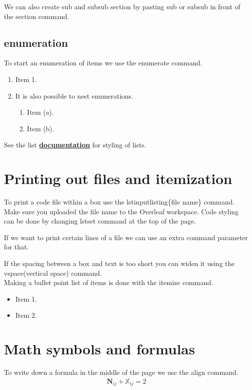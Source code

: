 \documentclass{article}
\begin{document}
We can also create sub and subsub section by pasting sub or subsub in front of the section command.
\subsection{enumeration}

To start an enumeration of items we use the enumerate command.
\begin{enumerate}
    \item Item 1.
    \item It is also possible to nest enumerations.
        \begin{enumerate}
            \item Item (a).
            \item Item (b).
        \end{enumerate}
\end{enumerate}

See the list \href{https://www.overleaf.com/learn/latex/Lists}{\bf{documentation}} for styling of lists.

\section{Printing out files and itemization}

To print a code file within a box use the lstinputlisting\{file name\} command. Make sure you uploaded the file name to the Overleaf workspace. Code styling can be done by changing lstset command at the top of the page.


If we want to print certain lines of a file we can use an extra command parameter for that.


\vspace{1cm}

If the spacing between a box and text is too short you can widen it using the vspace(vertical space) command.\\

Making a bullet point list of items is done with the itemize command.
\begin{itemize}
    \item Item 1.
    \item Item 2.
\end{itemize}

\section{Math symbols and formulas}
To write down a formula in the middle of the page we use the align command.
\begin{equation}\label{eq:exampleEquation}
\begin{split}
    \bm{N}_{ij} + \mathbb{X}_{ij} = 2
\end{split}
\end{equation}
\end{document}

